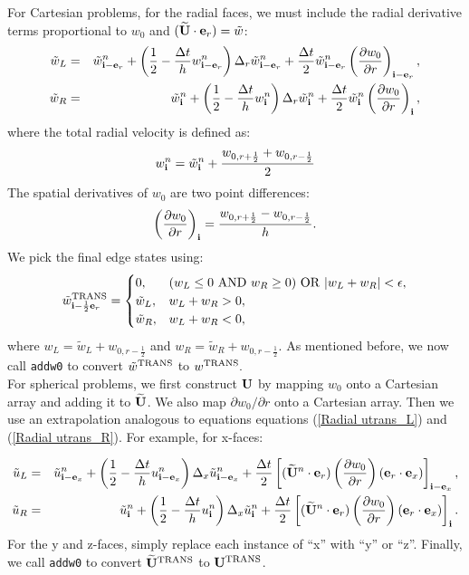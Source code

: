 \documentclass[11pt]{article}
\def\half  {\frac{1}{2}}
\def\dt    {\Delta t}
\def\trans {\rm TRANS}
\def\eb    {{\bf e}}
\def\ib    {{\bf i}}
\def\Ub    {{\bf U}}
\def\Ubt   {\widetilde{\bf U}}
\def\ut    {\tilde{u}}
\def\wt    {\tilde{w}}
\begin{document}
For Cartesian problems, for the radial faces, we must include the radial derivative terms proportional to $w_0$ and $(\Ubt\cdot\eb_r) = \wt$:
\begin{eqnarray}
\wt_L &=& \wt_{\ib-\eb_r}^n + \left(\half - \frac{\dt}{h}w_{\ib-\eb_r}^n\right)\Delta_r \wt_{\ib-\eb_r}^n + \frac{\dt}{2}\wt_{\ib-\eb_r}^n\left(\frac{\partial w_0}{\partial r}\right)_{\ib-\eb_r},\label{Radial utrans_L} \\
\wt_R &=& \wt_{\ib}^n + \left(\half - \frac{\dt}{h}w_{\ib}^n\right)\Delta_r \wt_{\ib}^n + \frac{\dt}{2}\wt_{\ib}^n\left(\frac{\partial w_0}{\partial r}\right)_{\ib},\label{Radial utrans_R}
\end{eqnarray}
where the total radial velocity is defined as:
\begin{equation}
w_{\ib}^n = \wt_{\ib}^n + \frac{w_{0,r+\half}+w_{0,r-\half}}{2}
\end{equation}
The spatial derivatives of $w_0$ are two point differences:
\begin{equation}
\left(\frac{\partial w_0}{\partial r}\right)_{\ib} = \frac{w_{0,r+\half}-w_{0,r-\half}}{h}.
\end{equation}
We pick the final edge states using:
\begin{equation}
\wt^{\trans}_{\ib-\half\eb_r} =
\begin{cases}
0, & (w_L \le 0 ~ {\rm AND} ~ w_R \ge 0) ~ {\rm OR} ~ |w_L + w_R| < \epsilon, \\
\wt_L, & w_L + w_R > 0, \\
\wt_R, & w_L + w_R < 0, \\
\end{cases}
\end{equation}
where $w_L = \wt_L + w_{0,r-\half}$ and $w_R = \wt_R + w_{0,r-\half}$.  As mentioned before, we now call {\tt addw0} to convert $\wt^{\trans}$ to $w^{\trans}.$\\

For spherical problems, we first construct $\Ub$ by mapping $w_0$ onto a Cartesian array and adding it to $\Ubt$.  We also map $\partial w_0/\partial r$ onto a Cartesian array.  Then we use an extrapolation analogous to equations equations (\ref{Radial utrans_L}) and (\ref{Radial utrans_R}).  For example, for x-faces:

\begin{eqnarray}
\ut_L &=& \ut_{\ib-\eb_x}^n + \left(\half - \frac{\dt}{h}u_{\ib-\eb_x}^n\right)\Delta_x\ut_{\ib-\eb_x}^n + \frac{\dt}{2}\left[(\Ubt^n\cdot\eb_r)\left(\frac{\partial w_0}{\partial r}\right)(\eb_r\cdot\eb_x)\right]_{\ib-\eb_x}, \\
\ut_R &=& \ut_{\ib}^n + \left(\half - \frac{\dt}{h}u_{\ib}^n\right)\Delta_x\ut_{\ib}^n + \frac{\dt}{2}\left[(\Ubt^n\cdot\eb_r)\left(\frac{\partial w_0}{\partial r}\right)(\eb_r\cdot\eb_x)\right]_{\ib}.
\end{eqnarray}
For the y and z-faces, simply replace each instance of ``x'' with ``y'' or ``z''.  Finally, we call {\tt addw0} to convert $\Ubt^{\trans}$ to $\Ub^{\trans}$.
\end{document}

